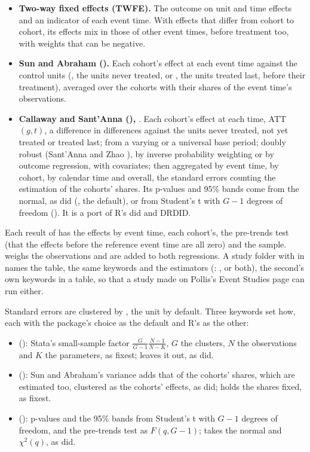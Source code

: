 \begin{itemize}
  \item \textbf{Two-way fixed effects (TWFE).} The outcome on unit and time effects and an indicator of each event time.
    With effects that differ from cohort to cohort, its effects mix in those of other event times, before treatment
    too, with weights that can be negative.
  \item \textbf{Sun and Abraham ().} Each cohort's effect at each event time against the control
    units (, the units never treated, or , the units treated last, before their
    treatment), averaged over the cohorts with their shares of the event time's observations.
  \item \textbf{Callaway and Sant'Anna (),} . Each cohort's effect at each
    time, ATT$(g, t)$, a difference in differences against the units never treated, not yet treated or treated last;
    from a varying or a universal base period; doubly robust (Sant'Anna and Zhao ), by inverse
    probability weighting or by outcome regression, with covariates; then aggregated by event time, by cohort, by
    calendar time and overall, the standard errors counting the estimation of the cohorts' shares. Its p-values and
    95\% bands come from the normal, as did (, the default), or from Student's t with
    $G-1$ degrees of freedom (). It is a port of R's did and DRDID.
\end{itemize}
Each result of  has the effects by event time, each cohort's, the pre-trends test (that the effects before the reference
event time are all zero) and the sample.  weighs the observations and  are added to both
regressions. A study folder with  in  names the table, the same keywords and the estimators
(: ,  or both), the second's own keywords in a
 table, so that a study made on Pollis's Event Studies page can run either.

Standard errors are clustered by , the unit by default. Three keywords set how, each with the package's
choice as the default and R's as the other:
\begin{itemize}
  \item {} (): Stata's small-sample factor $\frac{G}{G-1}\frac{N-1}{N-K}$, $G$ the clusters,
    $N$ the observations and $K$ the parameters, as fixest;  leaves it out, as did.
  \item {} (): Sun and Abraham's variance adds that of the cohorts' shares, which are
    estimated too, clustered as the cohorts' effects, as did;  holds the shares fixed,
    as fixest.
  \item {} (): p-values and the 95\% bands from Student's t with $G-1$ degrees of freedom, and
    the pre-trends test as $F(q, G-1)$;  takes the normal and $\chi^2(q)$, as did.
\end{itemize}

